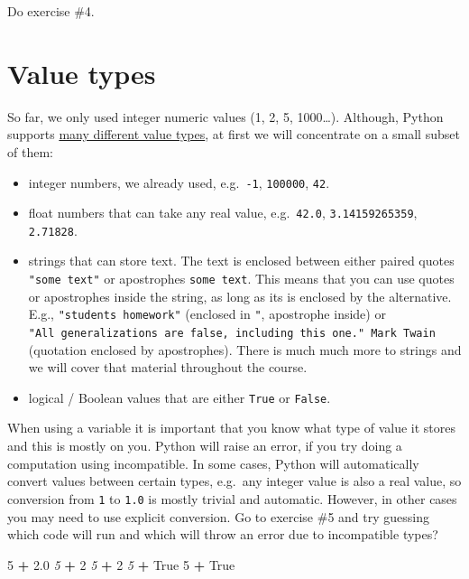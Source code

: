 \documentclass[
]{book}
\newenvironment{Shaded}{\begin{snugshade}}{\end{snugshade}}
\newcommand{\CommentTok}[1]{\textcolor[rgb]{0.56,0.35,0.01}{\textit{#1}}}
\newcommand{\DecValTok}[1]{\textcolor[rgb]{0.00,0.00,0.81}{#1}}
\newcommand{\FloatTok}[1]{\textcolor[rgb]{0.00,0.00,0.81}{#1}}
\newcommand{\OperatorTok}[1]{\textcolor[rgb]{0.81,0.36,0.00}{\textbf{#1}}}
\newcommand{\StringTok}[1]{\textcolor[rgb]{0.31,0.60,0.02}{#1}}
\newcommand{\VariableTok}[1]{\textcolor[rgb]{0.00,0.00,0.00}{#1}}
\providecommand{\tightlist}{%
  \setlength{\itemsep}{0pt}\setlength{\parskip}{0pt}}
\begin{document}
Do exercise \#4.

\hypertarget{value-types}{%
\section{Value types}\label{value-types}}

So far, we only used integer numeric values (1, 2, 5, 1000\ldots). Although, Python supports \href{https://docs.python.org/3/library/stdtypes.html}{many different value types}, at first we will concentrate on a small subset of them:

\begin{itemize}
\tightlist
\item
  integer numbers, we already used, e.g.~\texttt{-1}, \texttt{100000}, \texttt{42}.
\item
  float numbers that can take any real value, e.g.~\texttt{42.0}, \texttt{3.14159265359}, \texttt{2.71828}.
\item
  strings that can store text. The text is enclosed between either paired quotes \texttt{"some\ text"} or apostrophes \texttt{\textquotesingle{}some\ text\textquotesingle{}}. This means that you can use quotes or apostrophes inside the string, as long as its is enclosed by the alternative. E.g., \texttt{"students\textquotesingle{}\ homework"} (enclosed in \texttt{"}, apostrophe \texttt{\textquotesingle{}} inside) or \texttt{\textquotesingle{}"All\ generalizations\ are\ false,\ including\ this\ one."\ Mark\ Twain\textquotesingle{}} (quotation enclosed by apostrophes). There is much much more to strings and we will cover that material throughout the course.
\item
  logical / Boolean values that are either \texttt{True} or \texttt{False}.
\end{itemize}

When using a variable it is important that you know what type of value it stores and this is mostly on you. Python will raise an error, if you try doing a computation using incompatible. In some cases, Python will automatically convert values between certain types, e.g.~any integer value is also a real value, so conversion from \texttt{1} to \texttt{1.0} is mostly trivial and automatic. However, in other cases you may need to use explicit conversion. Go to exercise \#5 and try guessing which code will run and which will throw an error due to incompatible types?

\begin{Shaded}
\begin{Highlighting}[]
\DecValTok{5} \OperatorTok{+} \FloatTok{2.0}
\CommentTok{\textquotesingle{}5\textquotesingle{}} \OperatorTok{+} \DecValTok{2}
\CommentTok{\textquotesingle{}5\textquotesingle{}} \OperatorTok{+} \StringTok{\textquotesingle{}2\textquotesingle{}}
\CommentTok{\textquotesingle{}5\textquotesingle{}} \OperatorTok{+} \VariableTok{True}
\DecValTok{5} \OperatorTok{+} \VariableTok{True}
\end{Highlighting}
\end{Shaded}
\end{document}
